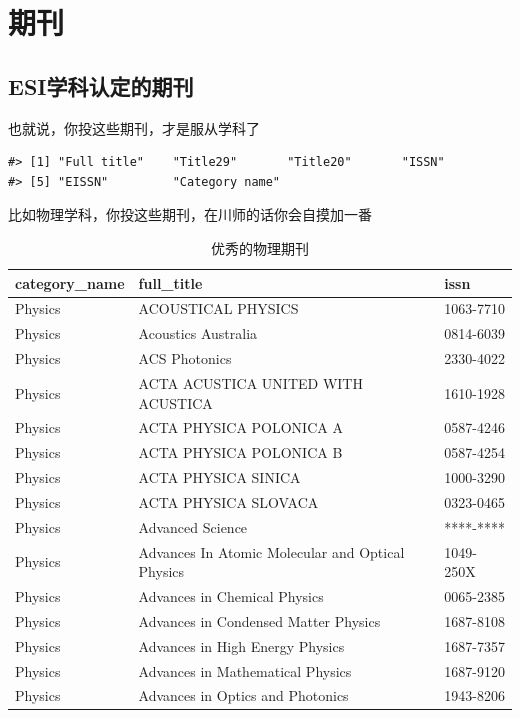 \documentclass[cn, 11pt, fancy, hide]{elegantbook}
\begin{document}
\hypertarget{jcr}{%
\chapter{期刊}\label{jcr}}

\hypertarget{esiux5b66ux79d1ux8ba4ux5b9aux7684ux671fux520a}{%
\section{ESI学科认定的期刊}\label{esiux5b66ux79d1ux8ba4ux5b9aux7684ux671fux520a}}

也就说，你投这些期刊，才是服从学科了

\begin{verbatim}
#> [1] "Full title"    "Title29"       "Title20"       "ISSN"         
#> [5] "EISSN"         "Category name"
\end{verbatim}

比如物理学科，你投这些期刊，在川师的话你会自摸加一番

\begin{table}[!h]

\caption{\label{tab:unnamed-chunk-40}优秀的物理期刊}
\centering
\begin{tabular}[t]{lll}
\toprule
category\_name & full\_title & issn\\
\midrule
Physics & ACOUSTICAL PHYSICS & 1063-7710\\
Physics & Acoustics Australia & 0814-6039\\
Physics & ACS Photonics & 2330-4022\\
Physics & ACTA ACUSTICA UNITED WITH ACUSTICA & 1610-1928\\
Physics & ACTA PHYSICA POLONICA A & 0587-4246\\
\addlinespace
Physics & ACTA PHYSICA POLONICA B & 0587-4254\\
Physics & ACTA PHYSICA SINICA & 1000-3290\\
Physics & ACTA PHYSICA SLOVACA & 0323-0465\\
Physics & Advanced Science & ****-****\\
Physics & Advances In Atomic Molecular and Optical Physics & 1049-250X\\
\addlinespace
Physics & Advances in Chemical Physics & 0065-2385\\
Physics & Advances in Condensed Matter Physics & 1687-8108\\
Physics & Advances in High Energy Physics & 1687-7357\\
Physics & Advances in Mathematical Physics & 1687-9120\\
Physics & Advances in Optics and Photonics & 1943-8206\\
\bottomrule
\end{tabular}
\end{table}
\end{document}
